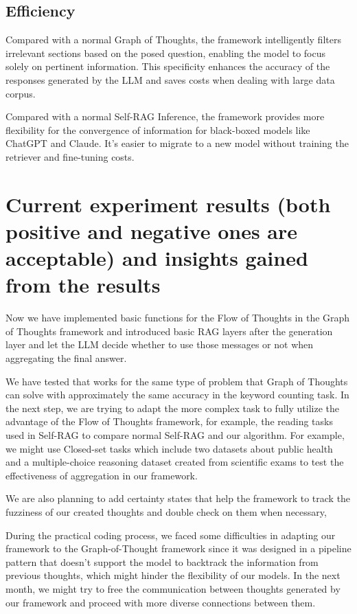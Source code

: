 \documentclass{article}
\begin{document}
\subsection{Efficiency}

Compared with a normal Graph of Thoughts, the framework intelligently filters irrelevant sections based on the posed question, enabling the model to focus solely on pertinent information. This specificity enhances the accuracy of the responses generated by the LLM and saves costs when dealing with large data corpus.

Compared with a normal Self-RAG Inference, the framework provides more flexibility for the convergence of information for black-boxed models like ChatGPT and Claude. It's easier to migrate to a new model without training the retriever and fine-tuning costs.

\section{
Current experiment results (both positive and negative ones are acceptable) and insights gained from the results}

Now we have implemented basic functions for the Flow of Thoughts in the Graph of Thoughts framework and introduced basic RAG layers after the generation layer and let the LLM decide whether to use those messages or not when aggregating the final answer.

We have tested that works for the same type of problem that Graph of Thoughts can solve with approximately the same accuracy in the keyword counting task. In the next step, we are trying to adapt the more complex task to fully utilize the advantage of the Flow of Thoughts framework, for example, the reading tasks used in Self-RAG to compare normal Self-RAG and our algorithm. For example, we might use Closed-set tasks\cite{asai2023selfraglearningretrievegenerate} which include two datasets about public health and a multiple-choice reasoning dataset created from scientific exams to test the effectiveness of aggregation in our framework.

We are also planning to add certainty states \cite{lin2022teachingmodelsexpressuncertainty} that help the framework to track the fuzziness of our created thoughts and double check on them when necessary, 

During the practical coding process, we faced some difficulties in adapting our framework to the Graph-of-Thought framework since it was designed in a pipeline pattern that doesn't support the model to backtrack the information from previous thoughts, which might hinder the flexibility of our models. In the next month, we might try to free the communication between thoughts generated by our framework and proceed with more diverse connections between them.


\medskip
{
\small
{}

}
\end{document}
